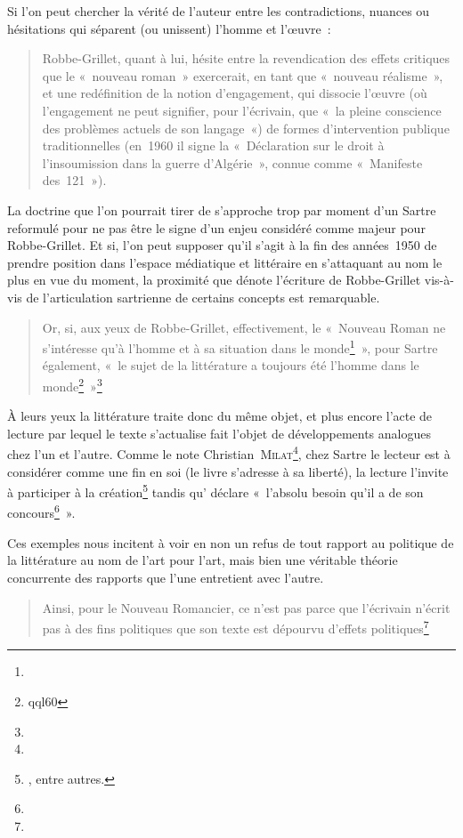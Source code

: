 \documentclass[12pt, a4paper]{article}
\begin{document}
Si l'on peut chercher la vérité de l'auteur entre les contradictions, nuances ou hésitations qui séparent (ou unissent) l'homme et l'œuvre~:
\begin{quote}
  Robbe-Grillet, quant à lui, hésite entre la revendication des effets critiques que le «~nouveau roman~» exercerait, en tant que «~nouveau réalisme~», et une redéfinition de la notion d’engagement, qui dissocie l’œuvre (où l’engagement ne peut signifier, pour l’écrivain, que «~la pleine conscience des problèmes actuels de son langage~«) de formes d’intervention publique traditionnelles (en~1960 il signe la «~Déclaration sur le droit à l’insoumission dans la guerre d’Algérie~», connue comme «~Manifeste des~121~»)\inte.
\end{quote}
La doctrine que l'on pourrait tirer de \punr{} s'approche trop par moment d'un Sartre reformulé pour ne pas être le signe d'un enjeu considéré comme majeur pour Robbe-Grillet. Et si, l'on peut supposer qu'il s'agit à la fin des années~1950 de prendre position dans l'espace médiatique et littéraire en s'attaquant au nom le plus en vue du moment, la proximité que dénote l'écriture de Robbe-Grillet vis-à-vis de l'articulation sartrienne de certains concepts est remarquable. 
\begin{quote}
    Or, si, aux yeux de Robbe-Grillet, effectivement, le «~Nouveau Roman ne s'intéresse qu'à l'homme et à sa situation dans le monde\footnote{}~», pour Sartre également, «~le sujet de la littérature a toujours été l'homme dans le monde\footnote{qql60}~»\footnote{}
\end{quote}
À leurs yeux la littérature traite donc du même objet, et plus encore l'acte de lecture par lequel le texte s'actualise fait l'objet de développements analogues chez l'un et l'autre. Comme le note Christian~\textsc{Milat}\footnote{}, chez Sartre le lecteur est à considérer comme une fin en soi (le livre s'adresse à sa liberté), la lecture l'invite à participer à la création\footnote{, entre autres.} tandis qu'\robbe{} déclare «~l'absolu besoin qu'il a de son concours\footnote{}~».  

Ces exemples nous incitent à voir en \punr{} non un refus de tout rapport au politique de la littérature au nom de l'art pour l'art, mais bien une véritable théorie concurrente des rapports que l'une entretient avec l'autre.
\begin{quote}
   Ainsi, pour le Nouveau Romancier, ce n'est pas parce que l'écrivain n'écrit pas à des fins politiques que son texte est dépourvu d'effets politiques\footnote{}
\end{quote}
\end{document}
